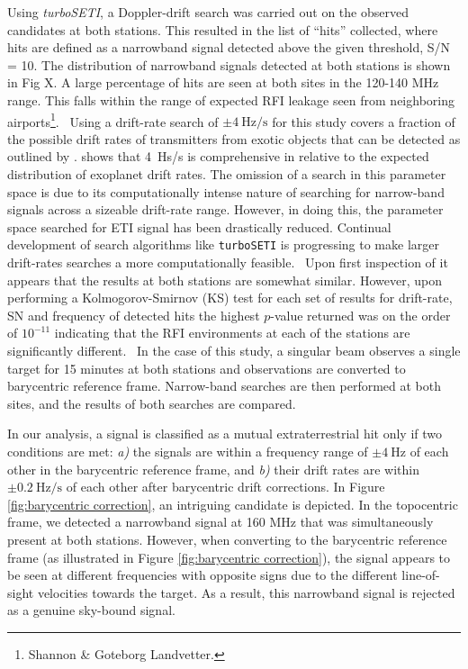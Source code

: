 Using \textit{turboSETI}, a Doppler-drift search was carried out on the observed candidates at both stations. This resulted in the list of “hits” collected, where hits are defined as a narrowband signal detected above the given threshold, S/N = 10. The distribution of narrowband signals detected at both stations is shown in Fig X. A large percentage of hits are seen at both sites in the 120-140 MHz range. This falls within the range of expected RFI leakage seen from neighboring airports\footnote{Shannon \& Goteborg Landvetter.}. \ 
Using a drift-rate search of $\pm 4 \ \text{Hz/s}$ for this study covers a fraction of the possible drift rates of transmitters from exotic objects that can be detected as outlined by \cite{Sheikh_2019}. \cite{LiNarrowBand} shows that 4~Hs/s is comprehensive in relative to the expected distribution of exoplanet drift rates. The omission of a search in this parameter space is due to its computationally intense nature of searching for narrow-band signals across a sizeable drift-rate range. However, in doing this, the parameter space searched for ETI signal has been drastically reduced. Continual development of search algorithms like \verb|turboSETI| is progressing to make larger drift-rates searches a more computationally feasible. \
Upon first inspection of  it appears that the results at both stations are somewhat similar. However, upon performing a Kolmogorov-Smirnov (KS) test for each set of results for drift-rate, SN and frequency of detected hits the highest $p$-value returned was on the order of $10^{-11}$ indicating that the RFI environments at each of the stations are significantly different. \ 
In the case of this study, a singular beam observes a single target for 15 minutes at both stations and observations are converted to barycentric reference frame. Narrow-band searches are then performed at both sites, and the results of both searches are compared.

In our analysis, a signal is classified as a mutual extraterrestrial hit only if two conditions are met: \textit{a)} the signals are within a frequency range of $\pm 4 \ \text{Hz}$ of each other in the barycentric reference frame, and \textit{b)} their drift rates are within $\pm 0.2 \ \text{Hz/s}$ of each other after barycentric drift corrections. In Figure \ref{fig:barycentric correction}, an intriguing candidate is depicted. In the topocentric frame, we detected a narrowband signal at 160 MHz that was simultaneously present at both stations. However, when converting to the barycentric reference frame (as illustrated in Figure \ref{fig:barycentric correction}), the signal appears to be seen at different frequencies with opposite signs due to the different line-of-sight velocities towards the target. As a result, this narrowband signal is rejected as a genuine sky-bound signal.

